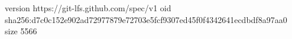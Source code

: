 version https://git-lfs.github.com/spec/v1
oid sha256:d7c0c152e902ad72977879e72703e5fcf9307ed45f0f4342641ecdbdf8a97aa0
size 5566
